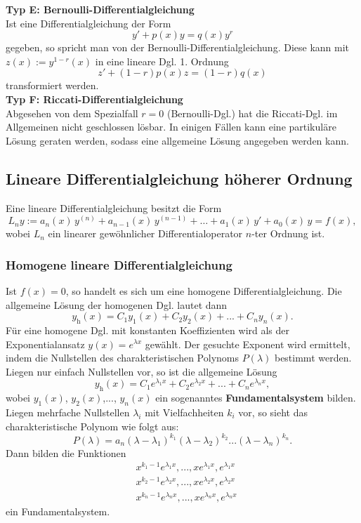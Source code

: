 \noindent
\textbf{Typ E: Bernoulli-Differentialgleichung}\\
Ist eine Differentialgleichung der Form
$$
y' + p(x)y = q(x) y^r
$$
gegeben, so spricht man von der Bernoulli-Differentialgleichung.
Diese kann mit $z(x):= y^{1-r}(x)$ in eine lineare Dgl. 1. Ordnung 
$$
z' +(1-r)p(x)z = (1-r)q(x)
$$
transformiert werden.  \\


\noindent
\textbf{Typ F: Riccati-Differentialgleichung}\\
Abgesehen von dem Spezialfall $r=0$ (Bernoulli-Dgl.) hat die Riccati-Dgl. im Allgemeinen nicht geschlossen l\"osbar. In einigen F\"allen kann eine partikul\"are L\"osung geraten werden, sodass eine allgemeine L\"osung angegeben werden kann. \\


\newpage
\subsection*{Lineare Differentialgleichung h\"oherer Ordnung}
Eine lineare Differentialgleichung besitzt die Form
$$
L_n y :=a_n(x)\, y^{(n)} + a_{n-1}(x)\, y^{(n-1)} + \dots + a_1(x)\, y' + a_0(x)\, y = f(x),
$$
wobei $L_n$ ein linearer gew\"ohnlicher Differentialoperator $n$-ter Ordnung ist.  \\


\subsubsection*{Homogene lineare Differentialgleichung}
Ist $f(x) = 0$, so handelt es sich um eine homogene Differentialgleichung.
Die allgemeine L\"osung der homogenen Dgl. lautet dann
$$
y_{\text{h}}(x) = C_1  y_1(x) + C_2 y_2(x) + ... + C_n y_n(x).
$$
F\"ur eine homogene Dgl. mit konstanten Koeffizienten wird als der Exponentialansatz $y(x) = e^{\lambda x }$ gew\"ahlt. Der gesuchte Exponent wird ermittelt, indem die Nullstellen des charakteristischen Polynoms $P(\lambda)$ bestimmt werden. 
Liegen nur einfach Nullstellen vor, so ist die allgemeine L\"osung
$$
 y_{\text{h}}(x) = C_1  e^{\lambda_1 x} + C_2 e^{\lambda_2 x}  + ... + C_n e^{\lambda_n x},
$$
wobei $y_1(x)$, $y_2(x)$,..., $y_n(x)$ ein sogenanntes \textbf{Fundamentalsystem} bilden. \\
Liegen mehrfache Nullstellen $\lambda_i$ mit Vielfachheiten $k_i$ vor, so sieht das charakteristische Polynom wie folgt aus:
$$
P(\lambda) = a_n (\lambda-\lambda_1)^{k_1}(\lambda-\lambda_2)^{k_2}...(\lambda-\lambda_n)^{k_n}.
$$
Dann bilden die Funktionen
\begin{align*}
& x^{k_1-1}e^{\lambda_1x}, ..., xe^{\lambda_1x}, e^{\lambda_1x} \\
& x^{k_2-1}e^{\lambda_2x}, ..., xe^{\lambda_2x}, e^{\lambda_2x} \\
& x^{k_n-1}e^{\lambda_nx}, ..., xe^{\lambda_nx}, e^{\lambda_nx}
\end{align*}
ein Fundamentalsystem.\\


